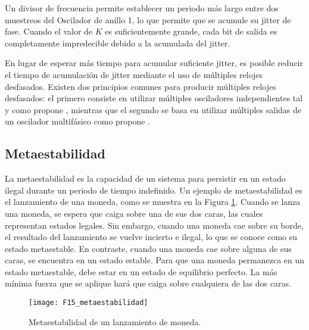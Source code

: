                 Un divisor de frecuencia permite establecer un periodo más largo entre dos muestreos del Oscilador de anillo 1, lo que permite que se acumule su jitter de fase. Cuando el valor de $K$ es suficientemente grande, cada bit de salida es completamente impredecible debido a la acumulada del jitter.

                En lugar de esperar más tiempo para acumular suficiente jitter, es posible reducir el tiempo de acumulación de jitter mediante el uso de múltiples relojes desfasados.  Existen dos principios comunes para producir múltiples relojes desfasados: el primero consiste en utilizar múltiples osciladores independientes tal y como propone \cite{Sunar2007}, mientras que el segundo se basa en utilizar múltiples salidas de un oscilador multifásico como propone \cite{Cherkaoui2013}.

        \subsection{Metaestabilidad}
            
            La metaestabilidad es la capacidad de un sistema para persistir en un estado ilegal durante un periodo de tiempo indefinido. Un ejemplo de metaestabilidad es el lanzamiento de una moneda, como se muestra en la Figura \ref{fig:F15_metaestabilidad}. Cuando se lanza una moneda, se espera que caiga sobre una de sus dos caras, las cuales representan estados legales. Sin embargo, cuando una moneda cae sobre su borde, el resultado del lanzamiento se vuelve incierto e ilegal, lo que se conoce como su estado metaestable. En contraste, cuando una moneda cae sobre alguna de sus caras, se encuentra en un estado estable. Para que una moneda permanezca en un estado metaestable, debe estar en un estado de equilibrio perfecto. La más mínima fuerza que se aplique hará que caiga sobre cualquiera de las dos caras.
            
            \begin{figure}[hbtp]
                \caption{Metaestabilidad de un lanzamiento de moneda.}
                \centering
                \texttt{[image: F15\_metaestabilidad]}
                \label{fig:F15_metaestabilidad}
            \end{figure}

